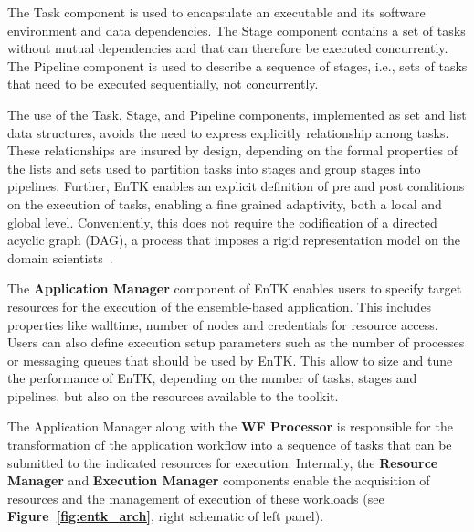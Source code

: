 The Task component is used to encapsulate an executable and 
its software environment and %
data dependencies. The Stage component contains a set of tasks without mutual
dependencies and that can therefore be executed concurrently. The Pipeline
component is used to describe a sequence of stages, i.e., %
sets of 
tasks that need to be executed sequentially, not concurrently.


The use of the Task, Stage, and Pipeline components, 
implemented as set and list data structures, avoids the need to express
explicitly relationship among tasks. These relationships are insured by
design, depending on the formal properties of the lists and sets used to
partition tasks into stages and group stages into pipelines.
Further, EnTK enables an explicit definition of pre and post conditions on
the execution of tasks, enabling a fine grained adaptivity, both a local and
global level. Conveniently, this does not require the codification of a
directed acyclic graph (DAG), a process that imposes a
rigid representation model on the domain
scientists~\cite{balasubramanian2017powerofmany}.

The \textbf{Application Manager} component of EnTK enables users to specify
target resources for the execution of the ensemble-based application. This
includes properties like walltime, number of nodes and credentials for
resource access. Users can also define execution setup parameters such as the
number of processes or messaging queues that should be used by EnTK\@. This
allow to size and tune the performance of EnTK, depending on the number of
tasks, stages and pipelines, but also on the resources available to the
toolkit.

The Application Manager along with the \textbf{WF Processor} is responsible
for the transformation of the application workflow into a sequence of tasks
that can be submitted to the indicated resources for execution. Internally,
the \textbf{Resource Manager} and \textbf{Execution Manager} components
enable the acquisition of resources and the management of execution of these
workloads (see \textbf{Figure~\ref{fig:entk_arch}}, right schematic of left
panel).


